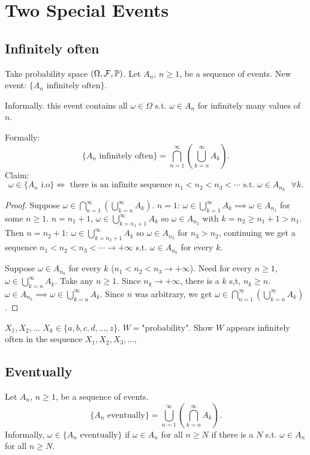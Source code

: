 \documentclass[10pt, a4paper]{article}
\begin{document}
\newpage

\section{Two Special Events}

\subsection{Infinitely often}
Take probability space $(\Omega, \mathcal{F}, \P)$.
Let $A_n$,
$n \geq 1$,
be a sequence of events.
New event:
$\{A_n\text{ infinitely often}\}$.

Informally.
this event contains all $\omega \in \Omega$ s.t. $\omega \in A_n$ for infinitely many values of $n$.

Formally:
\[
\{A_n\text{ infinitely often}\} = \bigcap_{n = 1}^{\infty}\left(\bigcup_{k = n}^{\infty}A_k\right).
\]
Claim:
\[
\omega \in \{A_n \text{ i.o}\} \iff \text{ there is an infinite sequence $n_1 < n_2 < n_3 < \dotsi$ s.t. $\omega \in A_{n_k}$ $\forall k$}.
\]
\begin{proof}
    Suppose $\omega \in \bigcap_{n = 1}^{\infty}\left(\bigcup_{k = n}^{\infty}A_k\right)$.
    $n = 1$:
    $\omega \in \bigcup_{k = 1}^{\infty}A_k \implies \omega \in A_{n_1}$ for some $n \geq 1$.
    $n = n_1 + 1$,
    $\omega \in \bigcup_{k = n_1 + 1}^{\infty}A_k$ so $\omega \in A_{n_2}$ with $k = n_2 \geq n_1 + 1 > n_1$.
    Then $n = n_2 + 1$:
    $\omega \in \bigcup_{k = n_2 + 1}^{\infty}A_k$ so $\omega \in A_{n_3}$  for $n_3 > n_2$,
    continuing we get a sequence $n_1 < n_2 < n_3 < \dotsi \to +\infty$ s.t. $\omega \in A_{n_k}$ for every $k$.

    Suppose $\omega \in A_{n_k}$ for every $k$
    ($n_1 < n_2 < n_3 \to +\infty$).
    Need for every $n \geq 1$,
    $\omega \in \bigcup_{k = n}^{\infty}A_k$.
    Take any $n \geq 1$.
    Since $n_k \to +\infty$,
    there is a $k$ s,t, $n_k \geq n$.
    $\omega \in A_{n_k} \implies \omega \in \bigcup_{k = n}^{\infty}A_k$.
    Since $n$ was arbitrary,
    we get $\omega \in \bigcap_{n = 1}^{\infty}\left(\bigcup_{k = n}^{\infty}A_k\right)$.
\end{proof}

$X_1, X_2, \dotsc$ $X_k \in \{a, b, c, d, \dotsc, z\}$.
$W = \text{"probability"}$.
Show $W$ appears infinitely often in the sequence $X_1, X_2, X_3, \dotsc,$

\subsection{Eventually}
Let $A_n$,
$n \geq 1$,
be a sequence of events.
\[
\{A_n\text{ eventually}\} = \bigcup_{n = 1}^{\infty}\left(\bigcap_{k = n}^{\infty}A_k\right).
\]
Informally,
$\omega \in \{A_n\text{ eventually}\}$ if $\omega \in A_n$ for all $n \geq N$ if there is a $N$ s.t. $\omega \in A_n$ for all $n \geq N$.
\end{document}
